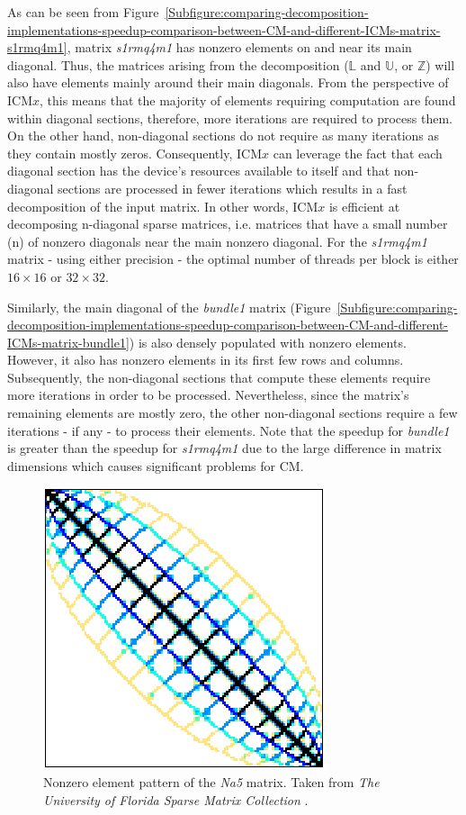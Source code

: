 \par As can be seen from Figure~\ref{Subfigure:comparing-decomposition-implementations-speedup-comparison-between-CM-and-different-ICMs-matrix-s1rmq4m1}, matrix \textit{s1rmq4m1} has nonzero elements on and near its main diagonal. Thus, the matrices arising from the decomposition ($ \mathbb{L} $ and $ \mathbb{U} $, or $ \mathbb{Z} $) will also have elements mainly around their main diagonals. From the perspective of ICM$ x $, this means that the majority of elements requiring computation are found within diagonal sections, therefore, more iterations are required to process them. On the other hand, non-diagonal sections do not require as many iterations as they contain mostly zeros. Consequently, ICM$ x $ can leverage the fact that each diagonal section has the device's resources available to itself and that non-diagonal sections are processed in fewer iterations which results in a fast decomposition of the input matrix. In other words, ICM$ x $ is efficient at decomposing n-diagonal sparse matrices, i.e. matrices that have a small number (n) of nonzero diagonals near the main nonzero diagonal. For the \textit{s1rmq4m1} matrix - using either precision - the optimal number of threads per block is either $ 16 \times 16 $ or $ 32 \times 32 $.
\par Similarly, the main diagonal of the \textit{bundle1} matrix (Figure~\ref{Subfigure:comparing-decomposition-implementations-speedup-comparison-between-CM-and-different-ICMs-matrix-bundle1}) is also densely populated with nonzero elements. However, it also has nonzero elements in its first few rows and columns. Subsequently, the non-diagonal sections that compute these elements require more iterations in order to be processed. Nevertheless, since the matrix's remaining elements are mostly zero, the other non-diagonal sections require a few iterations - if any - to process their elements. Note that the speedup for \textit{bundle1} is greater than the speedup for \textit{s1rmq4m1} due to the large difference in matrix dimensions which causes significant problems for CM.

\begin{figure}
	\centering
	\includegraphics[width=.35\textwidth, keepaspectratio, clip]{Images/ch3/matrices/na5.png}
	\caption{Nonzero element pattern of the \textit{Na5} matrix. Taken from \emph{The University of Florida Sparse Matrix Collection} \cite{Davis2011}.}
	\label{Figure:comparing-decomposition-implementations-speedup-comparison-between-CM-and-different-ICMs-matrix-na5}
\end{figure}

